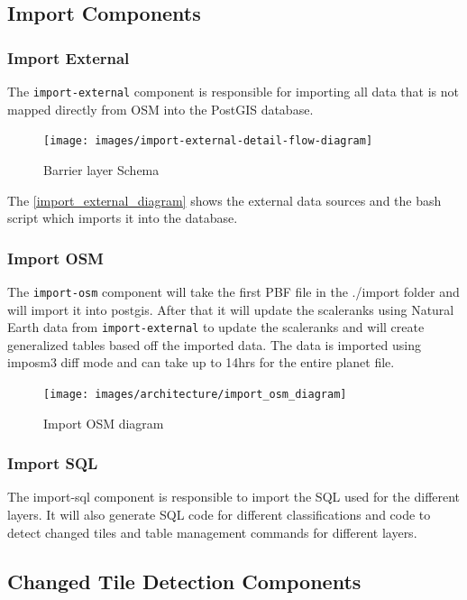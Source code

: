 \subsection{Import Components}

\subsubsection{Import External}

The \texttt{import-external} component is responsible for importing all data that is not mapped directly from OSM into the PostGIS database.

\begin{figure}[H]
  \centering
  \texttt{[image: images/import-external-detail-flow-diagram]}
  \caption{Barrier layer Schema}
  \label{import_external_diagram} 
\end{figure}

The \autoref{import_external_diagram} shows the external data sources and the bash script which imports it into the database.

\subsubsection{Import OSM}

The \texttt{import-osm} component will take the first PBF file in the ./import folder and will import it into postgis. After that it will update the scaleranks using Natural Earth data from \texttt{import-external} to update the scaleranks and will create generalized tables based off the imported data. The data is imported using imposm3 diff mode and can take up to 14hrs for the entire planet file.

\begin{figure}[H]
  \centering
  \texttt{[image: images/architecture/import\_osm\_diagram]}
  \caption{Import OSM diagram}
\end{figure}

\subsubsection{Import SQL}

The import-sql component is responsible to import the SQL used for the different layers. It will also generate SQL code for different classifications and code to detect changed tiles and table management commands for different layers.

\subsection{Changed Tile Detection Components}

